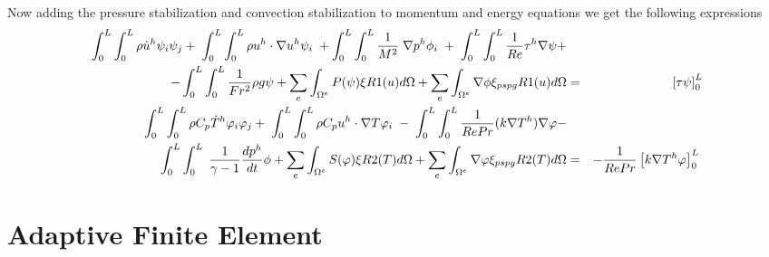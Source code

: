 \bigskip
\noindent Now adding the pressure stabilization and convection stabilization to momentum and energy equations we get the following expressions
\begin{eqnarray*}
\int_{0}^{L} \int_{0}^{L}\rho \dot{u}^h \psi_i \psi_j + \hspace{1mm}\int_{0}^{L} \int_{0}^{L} \rho u^h \cdot \nabla u^h \psi_i \hspace{1mm}  + \int_{0}^{L} \int_{0}^{L}  \frac{1}{M^2}\hspace{1mm}\nabla p^h \phi_i \hspace{1mm} + \hspace{1mm}\int_{0}^{L} \int_{0}^{L}\frac{1}{Re} \tau^h \nabla \psi +  \\ - \int_{0}^{L} \int_{0}^{L}\frac{1}{Fr^2}\rho g \psi + \sum_e \int_{\Omega^e} P(\psi) \xi R1(u)  d\Omega + \sum_e \int_{\Omega^e} \nabla \phi \xi_{pspg} R1(u)  d\Omega  &=& \left[\tau \psi \right]_0^L \\
\int_{0}^{L} \int_{0}^{L} \rho C_p \dot{T}^h \varphi_i \varphi_j + \hspace{1mm}\int_{0}^{L} \int_{0}^{L} \rho C_p u^h \cdot \nabla T \varphi_i \hspace{1mm} - \hspace{1mm} \int_{0}^{L} \int_{0}^{L} \frac{1}{Re Pr}(k \nabla T^h) \nabla \varphi - \\ \int_{0}^{L} \int_{0}^{L} \hspace{1mm} \frac{1}{\gamma -1} \frac{d p^h}{d t} \phi +  \sum_e \int_{\Omega^e} S(\varphi) \xi R2(T)  d\Omega + \sum_e \int_{\Omega^e} \nabla \varphi \xi_{pspg} R2(T)  d\Omega &=& -  \frac{1}{Re Pr} \left[k \nabla T^h \varphi \right]_0^L \hspace{1mm}\\
\end{eqnarray*}


\section{Adaptive Finite Element}